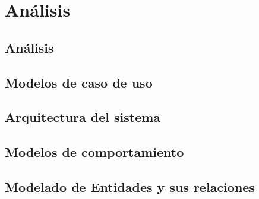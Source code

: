 \chapter{Análisis} \label{chap:objetivosPlanificación}

\section{Análisis}

\section{Modelos de caso de uso}

\section{Arquitectura del sistema}

\section{Modelos de comportamiento}

\section{Modelado de Entidades y sus relaciones}